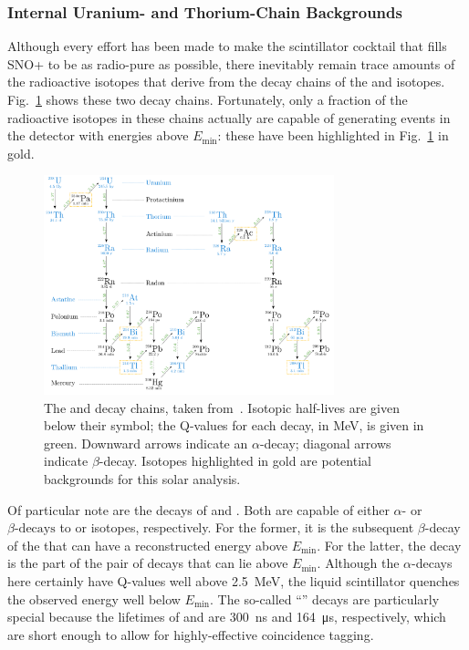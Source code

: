 \subsubsection{Internal Uranium- and Thorium-Chain Backgrounds}\label{sec:u_th_internals}
Although every effort has been made to make the scintillator cocktail that fills SNO+ to be as radio-pure as possible, there inevitably remain trace amounts of the radioactive isotopes that derive from the decay chains of the  and  isotopes. Fig.~\ref{fig:u_th_decay_chains} shows these two decay chains. Fortunately, only a fraction of the radioactive isotopes in these chains actually are capable of generating events in the detector with energies above $E_{\textrm{min}}$: these have been highlighted in Fig.~\ref{fig:u_th_decay_chains} in gold.

\begin{figure}
    \centering
    \includegraphics[width=0.75\textwidth]{6_SolarAnalysis/images/U238_Th232_decay_chains_tereza.png}
    \caption[The  and  decay chains.]{The  and  decay chains, taken from~\cite{kroupovaImprovingSensitivityNeutrinoless2020}. %
    Isotopic half-lives are given below their symbol; the Q-values for each decay, in MeV, is given in green. Downward arrows indicate an $\alpha$-decay; diagonal arrows indicate $\beta$-decay. Isotopes highlighted in gold are potential backgrounds for this solar analysis.}
    \label{fig:u_th_decay_chains}
\end{figure}

Of particular note are the decays of  and . Both are capable of either $\alpha\textrm{-}$ or $\beta\textrm{-decays}$ to  or  isotopes, respectively. For the former, it is the subsequent $\beta$-decay of the  that can have a reconstructed energy above $E_{\textrm{min}}$. For the latter, the  decay is the part of the pair of decays that can lie above $E_{\textrm{min}}$. Although the $\alpha$-decays here certainly have Q-values well above \SI{2.5}{\MeV}, the liquid scintillator quenches the observed energy well below $E_{\mathrm{min}}$. The so-called ``'' decays are particularly special because the lifetimes of  and  are \SI{300}{\nano\second} and \SI{164}{\micro\second}, respectively, which are short enough to allow for highly-effective coincidence tagging.

